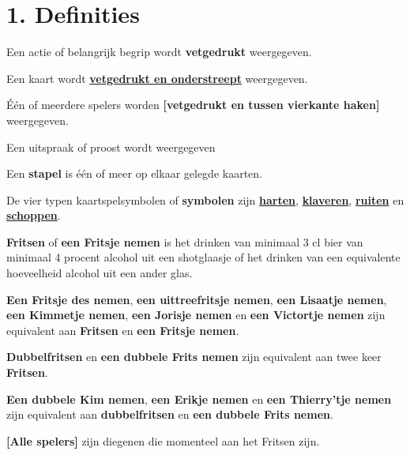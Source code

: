 \newpage
\drawBar{}

\section*{1. Definities}

\item Een actie of belangrijk begrip wordt \textbf{vetgedrukt} weergegeven.

\item Een kaart wordt \ul{\textbf{vetgedrukt en onderstreept}} weergegeven.

\item Één of meerdere spelers worden \textbf{[vetgedrukt en tussen vierkante haken]} weergegeven.

\item Een uitspraak of proost wordt  weergegeven 

\item Een \textbf{stapel} is één of meer op elkaar gelegde kaarten.

\item De vier typen kaartspelsymbolen of \textbf{symbolen} zijn \ul{\textbf{harten}}, \ul{\textbf{klaveren}}, \ul{\textbf{ruiten}} en \ul{\textbf{schoppen}}. 

\item \label{def:fritsen} \textbf{Fritsen} of \textbf{een Fritsje nemen} is het drinken van minimaal 3 cl bier van minimaal 4 procent alcohol uit een shotglaasje of het drinken van een equivalente hoeveelheid alcohol uit een ander glas.

\item \label{item:enkel_fritsen_equivalent}\textbf{Een Fritsje des nemen}, \textbf{een uittreefritsje nemen}, \textbf{een Lisaatje nemen}, \textbf{een Kimmetje nemen}, \textbf{een Jorisje nemen} en \textbf{een Victortje nemen}  zijn equivalent aan \textbf{Fritsen} en \textbf{een Fritsje nemen}. 

\item \label{item:dubbelfritsen_equivalent} \textbf{Dubbelfritsen} en \textbf{een dubbele Frits nemen} zijn equivalent aan twee keer \textbf{Fritsen}.

\item \textbf{Een dubbele Kim nemen}, \textbf{een Erikje nemen} en \textbf{een Thierry'tje nemen} zijn equivalent aan \textbf{dubbelfritsen} en \textbf{een dubbele Frits nemen}.

\item \textbf{[Alle spelers]} zijn diegenen die momenteel aan het Fritsen zijn.

